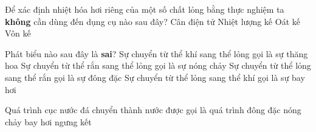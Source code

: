 \begin{ex}
	{\color{red}\footnotesize\ttfamily [L12C1B1-TN-35]}\par %
	Để xác định nhiệt hóa hơi riêng của một số chất lỏng bằng thực nghiệm ta \textbf{không} cần dùng đến dụng cụ nào sau đây?
	\choice
	{Cân điện tử}
	{Nhiệt lượng kế}
	{Oát kế}
	{\True Vôn kế}
\end{ex}

\begin{ex}
	{\color{red}\footnotesize\ttfamily [L12C1B1-TN-38]}\par %
	Phát biểu nào sau đây là \textbf{sai}?
	\choice
	{\True Sự chuyển từ thể khí sang thể lỏng gọi là sự thăng hoa}
	{Sự chuyển từ thể rắn sang thể lỏng gọi là sự nóng chảy}
	{Sự chuyển từ thể lỏng sang thể rắn gọi là sự đông đặc}
	{Sự chuyển từ thể lỏng sang thể khí gọi là sự bay hơi}
\end{ex}

\begin{ex}
	{\color{red}\footnotesize\ttfamily [L12C1B1-TN-41]}\par %
	Quá trình cục nước đá chuyển thành nước được gọi là quá trình
	\choice
	{đông đặc}
	{\True nóng chảy}
	{bay hơi}
	{ngưng kết}
\end{ex}

